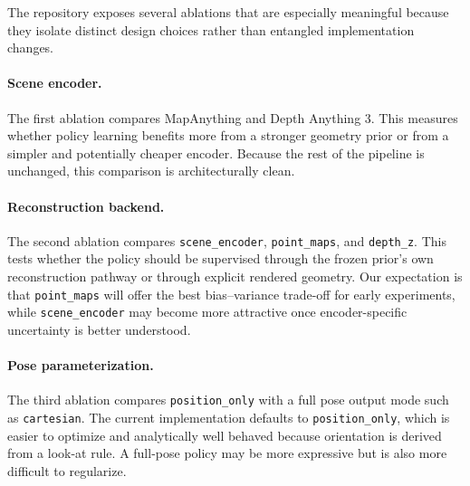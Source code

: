 The repository exposes several ablations that are especially meaningful because they isolate distinct design choices rather than entangled implementation changes.

\paragraph{Scene encoder.}
The first ablation compares MapAnything and Depth Anything 3. This measures whether policy learning benefits more from a stronger geometry prior or from a simpler and potentially cheaper encoder. Because the rest of the pipeline is unchanged, this comparison is architecturally clean.

\paragraph{Reconstruction backend.}
The second ablation compares \texttt{scene\_encoder}, \texttt{point\_maps}, and \texttt{depth\_z}. This tests whether the policy should be supervised through the frozen prior's own reconstruction pathway or through explicit rendered geometry. Our expectation is that \texttt{point\_maps} will offer the best bias--variance trade-off for early experiments, while \texttt{scene\_encoder} may become more attractive once encoder-specific uncertainty is better understood.

\paragraph{Pose parameterization.}
The third ablation compares \texttt{position\_only} with a full pose output mode such as \texttt{cartesian}. The current implementation defaults to \texttt{position\_only}, which is easier to optimize and analytically well behaved because orientation is derived from a look-at rule. A full-pose policy may be more expressive but is also more difficult to regularize.

\begin{table}[t]
    \centering
    \small
    \caption{Ablation template derived directly from existing Hydra switches.}
    \label{tab:ablations}
\end{table}

